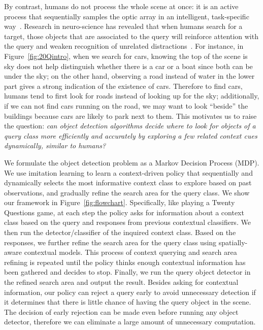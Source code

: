 By contrast, humans do not process the whole scene at once: it is an active process that sequentially samples the optic array in an intelligent, task-specific way~\cite{najemnik2005optimal}. Research in neuro-science has revealed that when humans search for a target, those objects that are associated to the query will reinforce attention with the query and weaken recognition of unrelated distractions~\cite{moores2003associative}. 
For instance, in Figure~\ref{fig:20Qintro}, when we search for cars, knowing the top of the scene is sky does not help distinguish whether there is a car or a boat since both can be under the sky; 
on the other hand, observing a road instead of water in the lower part gives a strong indication of the existence of cars. 
Therefore to find cars, humans tend to first look for roads instead of looking up for the sky; additionally, if we can not find cars running on the road,  we may want to look ``beside'' the buildings because cars are likely to park next to them. %
This motivates us to raise the question: \textit{can object detection algorithms decide where to look for objects of a query class more efficiently and accurately by exploring a few related context cues dynamically, similar to humans?}

We formulate the object detection problem as a Markov Decision Process (MDP). 
We use imitation learning to learn a context-driven policy that sequentially and dynamically selects the most informative context class to explore based on past observations, and gradually refine the search area for the query class. 
We show our framework in Figure~\ref{fig:flowchart}.  Specifically, like playing a Twenty Questions game, at each step the policy asks for information about a context class based on the query and responses from previous contextual classifiers. 
We then run the detector/classifier of the inquired context class. Based on the responses, we further refine the search area for the query class using spatially-aware contextual models. 
This process of context querying and search area refining is repeated until the policy thinks enough contextual information has been gathered and decides to stop. 
Finally, we run the query object detector in the refined search area and output the result. 
Besides asking for contextual information, our policy can reject a query early to avoid unnecessary detection if it determines that there is little chance of having the query object in the scene. 
The decision of early rejection can be made even before running any object detector, therefore we can eliminate a large amount of unnecessary computation. 

